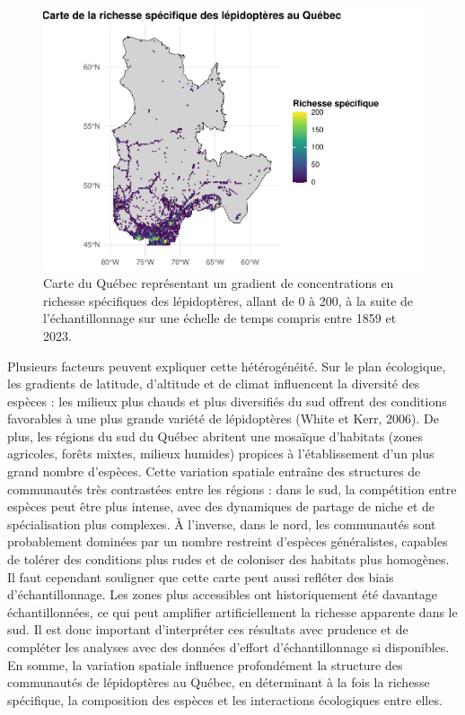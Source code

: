 \documentclass[9pt,twocolumn,twoside,]{pnas-new}
\begin{document}
\begin{figure}[H]

{\centering \includegraphics[width=0.7\linewidth]{rapport_final_BIO500_files/figure-latex/fig_richesse_spatiale-1} 

}

\caption{\label{fig:fig_richesse_spatiale}Carte du Québec représentant un gradient de concentrations en richesse spécifiques des lépidoptères, allant de 0 à 200, à la suite de l’échantillonnage sur une échelle de temps compris entre 1859 et 2023.}\label{fig:fig_richesse_spatiale}
\end{figure}

Plusieurs facteurs peuvent expliquer cette hétérogénéité. Sur le plan
écologique, les gradients de latitude, d'altitude et de climat
influencent la diversité des espèces : les milieux plus chauds et plus
diversifiés du sud offrent des conditions favorables à une plus grande
variété de lépidoptères (White et Kerr, 2006). De plus, les régions du
sud du Québec abritent une mosaïque d'habitats (zones agricoles, forêts
mixtes, milieux humides) propices à l'établissement d'un plus grand
nombre d'espèces. Cette variation spatiale entraîne des structures de
communautés très contrastées entre les régions : dans le sud, la
compétition entre espèces peut être plus intense, avec des dynamiques de
partage de niche et de spécialisation plus complexes. À l'inverse, dans
le nord, les communautés sont probablement dominées par un nombre
restreint d'espèces généralistes, capables de tolérer des conditions
plus rudes et de coloniser des habitats plus homogènes. Il faut
cependant souligner que cette carte peut aussi refléter des biais
d'échantillonnage. Les zones plus accessibles ont historiquement été
davantage échantillonnées, ce qui peut amplifier artificiellement la
richesse apparente dans le sud. Il est donc important d'interpréter ces
résultats avec prudence et de compléter les analyses avec des données
d'effort d'échantillonnage si disponibles. En somme, la variation
spatiale influence profondément la structure des communautés de
lépidoptères au Québec, en déterminant à la fois la richesse spécifique,
la composition des espèces et les interactions écologiques entre elles.
\end{document}
